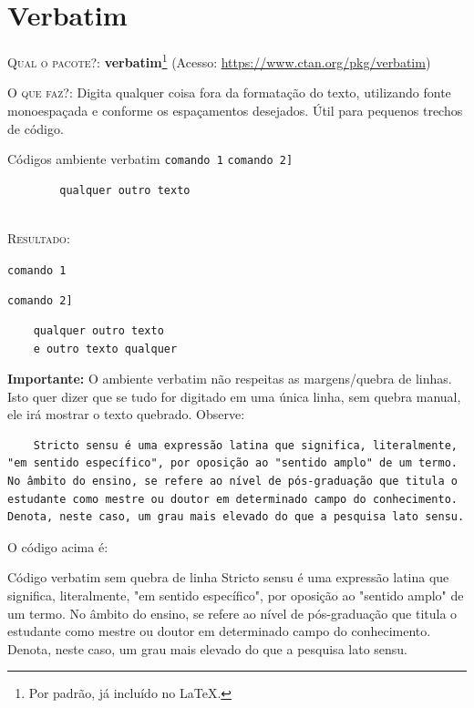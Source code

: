 \chapter{Verbatim}

\textsc{Qual o pacote?}: \textbf{verbatim}\footnote{Por padrão, já incluído no \LaTeX.} (Acesso: \url{https://www.ctan.org/pkg/verbatim})

\textsc{O que faz?}: Digita qualquer coisa fora da formatação do texto, utilizando fonte monoespaçada e conforme os espaçamentos desejados. Útil para pequenos trechos de código.
\ \\

\begin{codex}{Códigos ambiente verbatim}
	\verb|comando 1|
	\verb*|comando 2]|
	\begin{verbatim}
		qualquer outro texto
	\end{verbatim}
\end{codex}
\ \\
\textsc{Resultado}:

\verb|comando 1|

\verb*|comando 2]|

\begin{verbatim}
	qualquer outro texto
	e outro texto qualquer
\end{verbatim}

\textbf{Importante:} O ambiente verbatim não respeitas as margens/quebra de linhas. Isto quer dizer que se tudo for digitado em uma única linha, sem quebra manual, ele irá mostrar o texto quebrado. Observe:

\begin{verbatim}
	Stricto sensu é uma expressão latina que significa, literalmente, "em sentido específico", por oposição ao "sentido amplo" de um termo. No âmbito do ensino, se refere ao nível de pós-graduação que titula o estudante como mestre ou doutor em determinado campo do conhecimento. Denota, neste caso, um grau mais elevado do que a pesquisa lato sensu.
\end{verbatim}

O código acima é:

\begin{codex}{Código verbatim sem quebra de linha}
Stricto sensu é uma expressão latina que significa, literalmente, "em sentido específico", por oposição ao "sentido amplo" de um termo. No âmbito do ensino, se refere ao nível de pós-graduação que titula o estudante como mestre ou doutor em determinado campo do conhecimento. Denota, neste caso, um grau mais elevado do que a pesquisa lato sensu.
\end{codex}